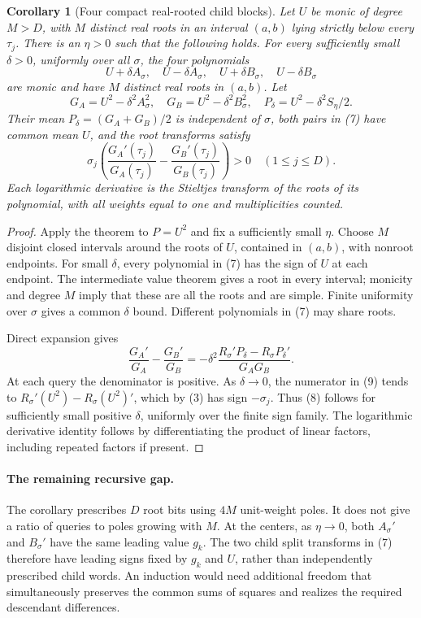 \documentclass[11pt]{article}
\newtheorem{corollary}{Corollary}
\begin{document}
\begin{corollary}[Four compact real-rooted child blocks]
Let $U$ be monic of degree $M>D$, with $M$ distinct real roots in
an interval $(a,b)$ lying strictly below every $\tau_j$. There is an
$\eta>0$ such that the following holds. For every sufficiently small
$\delta>0$, uniformly over all $\sigma$, the four polynomials
\[
 U+\delta A_\sigma,\quad U-\delta A_\sigma,\quad
 U+\delta B_\sigma,\quad U-\delta B_\sigma                  \tag{7}
\]
are monic and have $M$ distinct real roots in $(a,b)$. Let
\[
 G_A=U^2-\delta^2 A_\sigma^2,\quad
 G_B=U^2-\delta^2 B_\sigma^2,\quad
 P_\delta=U^2-\delta^2S_\eta/2.
\]
Their mean $P_\delta=(G_A+G_B)/2$ is independent of $\sigma$, both
pairs in (7) have common mean $U$, and the root transforms satisfy
\[
 \sigma_j\left(\frac{G_A'(\tau_j)}{G_A(\tau_j)}
                   -\frac{G_B'(\tau_j)}{G_B(\tau_j)}\right)>0
                      \quad(1\leq j\leq D).                  \tag{8}
\]
Each logarithmic derivative is the Stieltjes transform of the roots
of its polynomial, with all weights equal to one and multiplicities
counted.
\end{corollary}
\begin{proof}
Apply the theorem to $P=U^2$ and fix a sufficiently small $\eta$.
Choose $M$ disjoint closed intervals around the roots of $U$,
contained in $(a,b)$, with nonroot endpoints. For small $\delta$,
every polynomial in (7) has the sign of $U$ at each endpoint.
The intermediate value theorem gives a root in every interval;
monicity and degree $M$ imply that these are all the roots and are
simple. Finite uniformity over $\sigma$ gives a common $\delta$
bound. Different polynomials in (7) may share roots.

Direct expansion gives
\[
 \frac{G_A'}{G_A}-\frac{G_B'}{G_B}
     =-\delta^2\frac{R_\sigma'P_\delta-R_\sigma P_\delta'}
                         {G_A G_B}.                            \tag{9}
\]
At each query the denominator is positive. As $\delta\to0$,
the numerator in (9) tends to
$R_\sigma'(U^2)-R_\sigma(U^2)'$, which by (3) has sign
$-\sigma_j$. Thus (8) follows for sufficiently small positive
$\delta$, uniformly over the finite sign family. The logarithmic
 derivative identity follows by differentiating the product of
linear factors, including repeated factors if present.
\end{proof}

\paragraph{The remaining recursive gap.}
The corollary prescribes $D$ root bits using $4M$ unit-weight poles.
It does not give a ratio of queries to poles growing with $M$.
At the centers, as $\eta\to0$, both $A_\sigma'$ and $B_\sigma'$
have the same leading value $g_k$. The two child split transforms
in (7) therefore have leading signs fixed by $g_k$ and $U$, rather
than independently prescribed child words. An induction would need
additional freedom that simultaneously preserves the common sums
of squares and realizes the required descendant differences.
\end{document}
